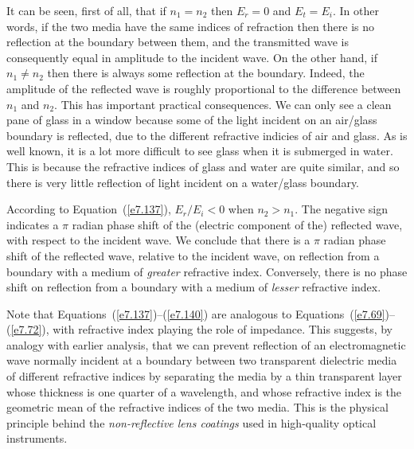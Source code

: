 It can be seen, first of all, that if $n_1=n_2$ then $E_r=0$ and $E_t=E_i$.
In other words, if the two media have the same indices of refraction then
there is no reflection  at the boundary between them, and the transmitted
wave is consequently equal in amplitude to the incident wave. On the other
hand, if $n_1\neq n_2$ then there is always some reflection at the boundary. Indeed,
the amplitude of the reflected wave is roughly proportional to the difference between $n_1$ and $n_2$. This has  important practical consequences.
We can only see a clean pane of glass in a window because some of the light incident
on an air/glass boundary is reflected, due to the different refractive indicies
of air and glass. As is well known, it is a lot more difficult to see glass when it is submerged in water. This is because the refractive indices of glass and water are quite similar, and so there is very little reflection of light
incident on a water/glass boundary.

According to Equation~(\ref{e7.137}), $E_r/E_i<0$ when $n_2> n_1$. 
The negative sign indicates a $\pi$ radian  phase shift of the (electric component of the) reflected wave, with
respect to the incident wave. We conclude that there is a $\pi$ radian phase shift of the reflected wave, relative to the incident wave, on reflection from a boundary with a
medium of {\em greater}\/ refractive index. Conversely, there is no 
 phase shift
on reflection from a boundary with a medium of {\em lesser}\/ refractive index.

Note that Equations~(\ref{e7.137})--(\ref{e7.140}) are analogous to Equations~(\ref{e7.69})--(\ref{e7.72}), with refractive index playing the role of
impedance. This suggests, by analogy with earlier analysis, that we
can prevent  reflection of an electromagnetic wave normally incident at a boundary between two
transparent dielectric media of different refractive indices by separating the media
by a thin transparent layer whose thickness is one quarter of a wavelength, and whose
refractive index is the geometric mean of the refractive indices of the two
media. This is the physical principle behind the {\em non-reflective lens coatings}\/ used
in high-quality optical instruments. 

